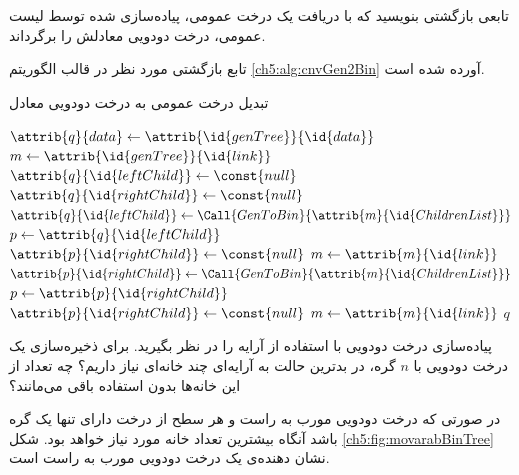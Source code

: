  تابعی بازگشتی بنویسید که با دریافت یک درخت عمومی، پیاده‌سازی شده توسط لیست عمومی، درخت دودویی معادلش را برگرداند. 


تابع بازگشتی مورد نظر در قالب الگوریتم {\ref{ch5:alg:cnvGen2Bin}} آورده شده است.

\begin{algorithm}
\caption{تبدیل درخت عمومی به درخت دودویی معادل}\label{ch5:alg:cnvGen2Bin}
\begin{latin}
\begin{algorithmic}[1]
				\State	\Return {}
		\EndIf
		\State	{}
		\State	$\attrib{q}{data} \gets \attrib{\id{genTree}}{\id{data}}$
		\State	$m \gets \attrib{\id{genTree}}{\id{link}}$
				\State	$\attrib{q}{\id{leftChild}} \gets \const{null}$
				\State	$\attrib{q}{\id{rightChild}} \gets \const{null}	$
		\Else
				\State	$\attrib{q}{\id{leftChild}} \gets \Call{GenToBin}{\attrib{m}{\id{ChildrenList}}}$ 
				\State	$p \gets \attrib{q}{\id{leftChild}}$
				\State	$\attrib{p}{\id{rightChild}} \gets \const{null}$
				\State	$m \gets \attrib{m}{\id{link}}$
						\State	$\attrib{p}{\id{rightChild}} \gets \Call{GenToBin}{\attrib{m}{\id{ChildrenList}}}$ 
						\State	$p \gets \attrib{p}{\id{rightChild}}$
						\State	$\attrib{p}{\id{rightChild}} \gets \const{null}$
						\State	$m \gets \attrib{m}{\id{link}}$
				\EndWhile
		\EndIf		
		\State	\Return $q$		
\EndFunction
\end{algorithmic}
\end{latin}
\end{algorithm}

 پیاده‌سازی درخت دودویی با استفاده از آرایه را در نظر بگیرید. برای ذخیره‌سازی یک درخت دودویی با {$n$} گره، در بدترین حالت به آرایه‌ای چند خانه‌ای نیاز داریم؟ چه تعداد از این خانه‌ها بدون استفاده باقی می‌مانند؟


در صورتی که درخت دودویی مورب به راست و هر سطح از درخت دارای تنها یک گره باشد آنگاه بیشترین تعداد خانه مورد نیاز خواهد بود. شکل {\ref{ch5:fig:movarabBinTree}} نشان دهنده‌ی یک درخت دودویی مورب به راست است.

